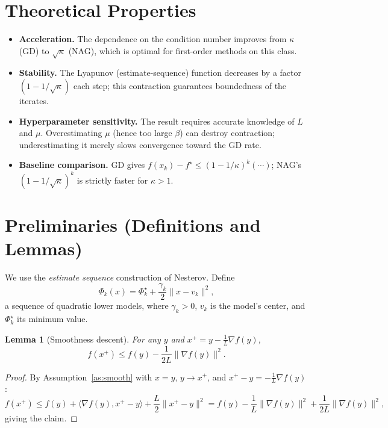 \documentclass[11pt]{article}
\newtheorem{lemma}{Lemma}
\begin{document}
\section*{Theoretical Properties}

\begin{itemize}
\item \textbf{Acceleration.} The dependence on the condition number improves from $\kappa$ (GD) to $\sqrt{\kappa}$ (NAG), which is optimal for first-order methods on this class.
\item \textbf{Stability.} The Lyapunov (estimate-sequence) function decreases by a factor $(1-1/\sqrt{\kappa})$ each step; this contraction guarantees boundedness of the iterates.
\item \textbf{Hyperparameter sensitivity.} The result requires accurate knowledge of $L$ and $\mu$. Overestimating $\mu$ (hence too large $\beta$) can destroy contraction; underestimating it merely slows convergence toward the GD rate.
\item \textbf{Baseline comparison.} GD gives $f(x_k)-f^\star \le (1-1/\kappa)^k(\cdots)$; NAG's $(1-1/\sqrt\kappa)^k$ is strictly faster for $\kappa>1$.
\end{itemize}

\section*{Preliminaries (Definitions and Lemmas)}

We use the \emph{estimate sequence} construction of Nesterov. Define
\[
\Phi_k(x) = \Phi_k^\star + \frac{\gamma_k}{2}\|x - v_k\|^2,
\]
a sequence of quadratic lower models, where $\gamma_k>0$, $v_k$ is the model's center, and $\Phi_k^\star$ its minimum value.

\begin{lemma}[Smoothness descent]\label{lem:descent}
For any $y$ and $x^+ = y - \frac{1}{L}\nabla f(y)$,
\[
f(x^+) \le f(y) - \frac{1}{2L}\|\nabla f(y)\|^2.
\]
\end{lemma}
\begin{proof}
By Assumption~\ref{as:smooth} with $x=y$, $y\!\to\!x^+$, and $x^+-y=-\frac1L\nabla f(y)$:
\[
f(x^+) \le f(y) + \langle \nabla f(y), x^+-y\rangle + \frac{L}{2}\|x^+-y\|^2
= f(y) - \frac1L\|\nabla f(y)\|^2 + \frac{1}{2L}\|\nabla f(y)\|^2,
\]
giving the claim.
\end{proof}
\end{document}
